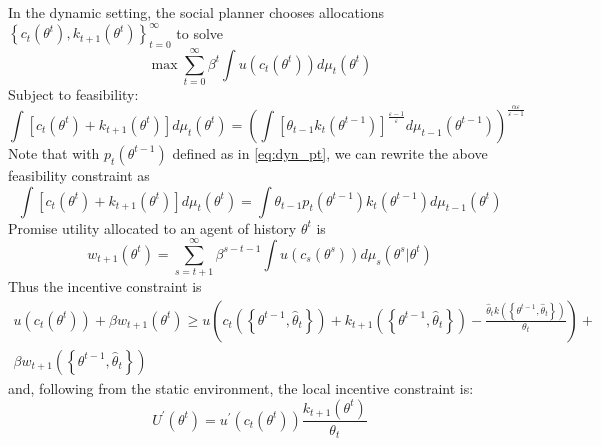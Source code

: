 \documentclass[11pt]{article}
\begin{document}
In the dynamic setting, the social planner chooses allocations $\left\{ c_{t}\left(\theta^{t}\right),k_{t+1}\left(\theta^{t}\right)\right\} _{t=0}^{\infty}$
to solve 
\begin{equation}
\max\sum_{t=0}^{\infty}\beta^{t}\int u\left(c_{t}\left(\theta^{t}\right)\right)d\mu_{t}\left(\theta^{t}\right)\label{eq:dyn_plan}
\end{equation}
Subject to feasibility: 
\begin{equation}
\int\left[c_{t}\left(\theta^{t}\right)+k_{t+1}\left(\theta^{t}\right)\right]d\mu_{t}\left(\theta^{t}\right)=\left(\int\left[\theta_{t-1}k_{t}\left(\theta^{t-1}\right)\right]^{\frac{\varepsilon-1}{\varepsilon}}d\mu_{t-1}\left(\theta^{t-1}\right)\right)^{\frac{\alpha\varepsilon}{\varepsilon-1}}\label{eq:dyn_feas1}
\end{equation}
Note that with $p_{t}\left(\theta^{t-1}\right)$ defined as in \eqref{eq:dyn_pt},
we can rewrite the above feasibility constraint as 
\begin{equation}
\int\left[c_{t}\left(\theta^{t}\right)+k_{t+1}\left(\theta^{t}\right)\right]d\mu_{t}\left(\theta^{t}\right)=\int\theta_{t-1}p_{t}\left(\theta^{t-1}\right)k_{t}\left(\theta^{t-1}\right)d\mu_{t-1}\left(\theta^{t}\right)\label{eq:dyn_feas2}
\end{equation}
Promise utility allocated to an agent of history $\theta^{t}$ is
\begin{equation}
w_{t+1}\left(\theta^{t}\right)=\sum_{s=t+1}^{\infty}\beta^{s-t-1}\int u\left(c_{s}\left(\theta^{s}\right)\right)d\mu_{s}\left(\theta^{s}\big|\theta^{t}\right)
\end{equation}
Thus the incentive constraint is 
\begin{multline}
u\left(c_{t}\left(\theta^{t}\right)\right)+\beta w_{t+1}\left(\theta^{t}\right)\ge u\left(c_{t}\left(\left\{ \theta^{t-1},\hat{\theta}_{t}\right\} \right)+k_{t+1}\left(\left\{ \theta^{t-1},\hat{\theta}_{t}\right\} \right)-\frac{\hat{\theta}_{t}k\left(\left\{ \theta^{t-1},\hat{\theta}_{t}\right\} \right)}{\theta_{t}}\right)+\\
\beta w_{t+1}\left(\left\{ \theta^{t-1},\hat{\theta}_{t}\right\} \right)
\end{multline}
and, following from the static environment, the local incentive constraint is: 
\begin{equation}
U^{\prime}\left(\theta^{t}\right)=u^{\prime}\left(c_{t}\left(\theta^{t}\right)\right)\frac{k_{t+1}\left(\theta^{t}\right)}{\theta_{t}}\label{eq:dyn_ic}
\end{equation}
\end{document}
